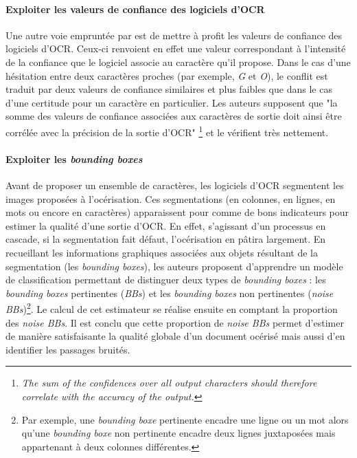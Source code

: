 \documentclass[10pt,twoside]{article}
\begin{document}
    \paragraph{Exploiter les valeurs de confiance des logiciels d'OCR}
    Une autre voie empruntée par \cite{Springmann2016a} est de mettre à profit les valeurs de confiance 
    des logiciels d'OCR. Ceux-ci renvoient en effet une valeur correspondant à l'intensité de la confiance que le
    logiciel associe au caractère qu'il propose. Dans le cas d'une hésitation entre deux caractères
    proches (par exemple, \textit{G} et \textit{O}), le conflit est traduit par deux valeurs de confiance similaires et plus
    faibles que dans le cas d'une certitude pour un caractère en particulier. Les auteurs supposent que "la somme des 
    valeurs de confiance associées aux caractères de sortie doit ainsi être corrélée avec la précision de la sortie d'OCR"
    \footnote{\textit{The sum of the confidences over all output characters should therefore correlate with the accuracy of the output.}} et le vérifient très nettement.

    \paragraph{Exploiter les \textit{bounding boxes}}
    Avant de proposer un ensemble de caractères, les logiciels d'OCR segmentent les images proposées à l'océrisation. Ces
    segmentations (en colonnes, en lignes, en mots ou encore en caractères) apparaissent pour \cite{Gupta2015a}
    comme de bons indicateurs pour estimer la qualité d'une sortie d'OCR. En effet, s'agissant d'un processus en cascade,
    si la segmentation fait défaut, l'océrisation en pâtira largement. En recueillant les informations graphiques associées
    aux objets résultant de la segmentation (les \textit{bounding boxes}), les auteurs proposent d'apprendre un modèle de 
    classification permettant de distinguer deux types de \textit{bounding boxes} : les \textit{bounding boxes} pertinentes
    (\textit{BBs}) et les \textit{bounding boxes} non pertinentes (\textit{noise BBs})\footnote{Par exemple, une 
    \textit{bounding boxe} pertinente encadre une ligne ou un mot alors qu'une \textit{bounding boxe} non pertinente 
    encadre deux lignes juxtaposées mais appartenant à deux colonnes différentes.}. Le calcul de cet estimateur se 
    réalise ensuite en comptant la proportion des \textit{noise BBs}. Il est conclu que cette proportion de \textit{noise BBs}
    permet d'estimer de manière satisfaisante la qualité globale d'un document océrisé mais aussi d'en identifier les 
    passages bruités.
\end{document}
